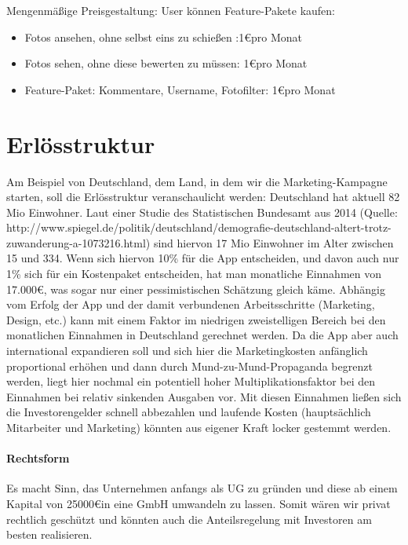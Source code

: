 Mengenmäßige Preisgestaltung: User können Feature-Pakete kaufen:
\begin{itemize}
\item Fotos ansehen, ohne selbst eins zu schießen :1\euro pro Monat
\item Fotos sehen, ohne diese bewerten zu müssen: 1\euro pro Monat
\item Feature-Paket: Kommentare, Username, Fotofilter: 1\euro pro Monat
\end{itemize}


\section{Erlösstruktur}
Am Beispiel von Deutschland, dem Land, in dem wir die Marketing-Kampagne starten, soll die Erlösstruktur veranschaulicht werden:
Deutschland hat aktuell 82 Mio Einwohner. Laut einer Studie des Statistischen Bundesamt aus 2014 (Quelle: http://www.spiegel.de/politik/deutschland/demografie-deutschland-altert-trotz-zuwanderung-a-1073216.html) sind hiervon 17 Mio Einwohner im Alter zwischen 15 und 334. Wenn sich hiervon 10\% für die App entscheiden, und davon auch nur 1\% sich für ein Kostenpaket entscheiden, hat man monatliche Einnahmen von 17.000\euro, was sogar nur einer pessimistischen Schätzung gleich käme. Abhängig vom Erfolg der App und der damit verbundenen Arbeitsschritte (Marketing, Design, etc.) kann mit einem Faktor im niedrigen zweistelligen Bereich bei den monatlichen Einnahmen in Deutschland gerechnet werden. Da die App aber auch international expandieren soll und sich hier die Marketingkosten anfänglich proportional erhöhen und dann durch  Mund-zu-Mund-Propaganda begrenzt werden, liegt hier nochmal ein potentiell hoher Multiplikationsfaktor bei den Einnahmen bei relativ sinkenden Ausgaben vor. Mit diesen Einnahmen ließen sich die Investorengelder schnell abbezahlen und laufende Kosten (hauptsächlich Mitarbeiter und Marketing) könnten aus eigener Kraft locker gestemmt werden.


\paragraph{Rechtsform}
Es macht Sinn, das Unternehmen anfangs als UG zu gründen und diese ab einem Kapital von 25000\euro in eine GmbH umwandeln zu lassen. Somit wären wir privat rechtlich geschützt und könnten auch die Anteilsregelung mit Investoren am besten realisieren.

